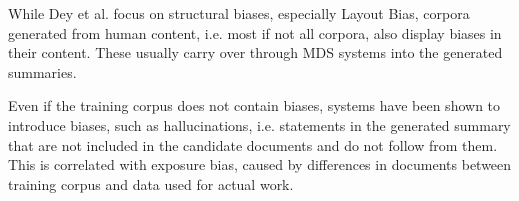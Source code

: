 \documentclass[../main.tex]{subfiles}
\begin{document}
While Dey et al. focus on structural biases, especially Layout Bias, corpora generated from human content, i.e. most if not all corpora, also display biases in their content. These usually carry over through MDS systems into the generated summaries. \cite{nadeem-etal-2021-stereoset}

Even if the training corpus does not contain biases, systems have been shown to introduce biases, such as hallucinations, i.e. statements in the generated summary that are not included in the candidate documents and do not follow from them. This is correlated with exposure bias, caused by differences in documents between training corpus and data used for actual work. \cite{Exposure_bias_wang_sennrich_2020}
\end{document}
